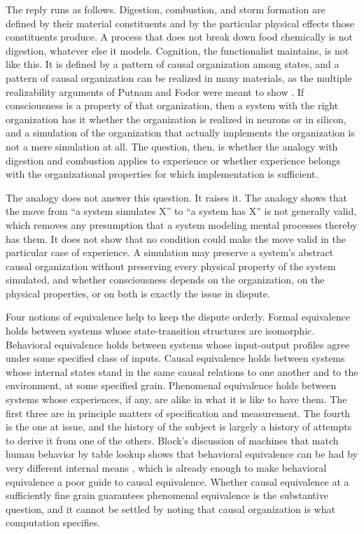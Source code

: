 \documentclass[12pt]{article}
\theoremstyle{definition}
\begin{document}
The reply runs as follows. Digestion, combustion, and storm formation are defined by their material constituents and by the particular physical effects those constituents produce. A process that does not break down food chemically is not digestion, whatever else it models. Cognition, the functionalist maintains, is not like this. It is defined by a pattern of causal organization among states, and a pattern of causal organization can be realized in many materials, as the multiple realizability arguments of Putnam and Fodor were meant to show \cite{putnam1967,fodor1974}. If consciousness is a property of that organization, then a system with the right organization has it whether the organization is realized in neurons or in silicon, and a simulation of the organization that actually implements the organization is not a mere simulation at all. The question, then, is whether the analogy with digestion and combustion applies to experience or whether experience belongs with the organizational properties for which implementation is sufficient.

The analogy does not answer this question. It raises it. The analogy shows that the move from ``a system simulates X'' to ``a system has X'' is not generally valid, which removes any presumption that a system modeling mental processes thereby has them. It does not show that no condition could make the move valid in the particular case of experience. A simulation may preserve a system's abstract causal organization without preserving every physical property of the system simulated, and whether consciousness depends on the organization, on the physical properties, or on both is exactly the issue in dispute.

Four notions of equivalence help to keep the dispute orderly. Formal equivalence holds between systems whose state-transition structures are isomorphic. Behavioral equivalence holds between systems whose input-output profiles agree under some specified class of inputs. Causal equivalence holds between systems whose internal states stand in the same causal relations to one another and to the environment, at some specified grain. Phenomenal equivalence holds between systems whose experiences, if any, are alike in what it is like to have them. The first three are in principle matters of specification and measurement. The fourth is the one at issue, and the history of the subject is largely a history of attempts to derive it from one of the others. Block's discussion of machines that match human behavior by table lookup shows that behavioral equivalence can be had by very different internal means \cite{block1981}, which is already enough to make behavioral equivalence a poor guide to causal equivalence. Whether causal equivalence at a sufficiently fine grain guarantees phenomenal equivalence is the substantive question, and it cannot be settled by noting that causal organization is what computation specifies.
\end{document}
